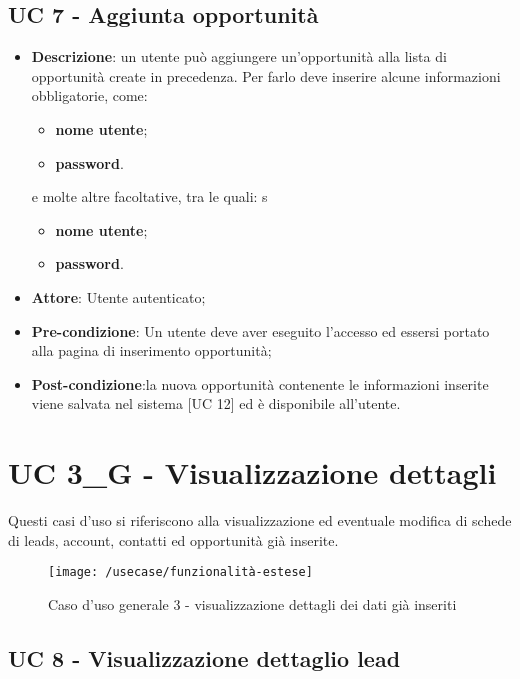 \subsection{UC 7 - Aggiunta opportunità} %


\begin{itemize}
	\item \textbf{Descrizione}: un utente può aggiungere un'opportunità alla lista di opportunità create in precedenza. Per farlo deve inserire alcune informazioni obbligatorie, come:
	\begin{itemize}
		\item \textbf{nome utente};
		\item \textbf{password}.
	\end{itemize}
	e molte altre facoltative, tra le quali:
	s\begin{itemize}
		\item \textbf{nome utente};
		\item \textbf{password}.
	\end{itemize}
	\item \textbf{Attore}: Utente autenticato;
	\item \textbf{Pre-condizione}: Un utente deve aver eseguito l'accesso ed essersi portato alla pagina di inserimento opportunità;
	\item \textbf{Post-condizione}:la nuova opportunità contenente le informazioni inserite viene salvata nel sistema [UC 12] ed è disponibile all'utente.
\end{itemize}

\section{UC 3\_G - Visualizzazione dettagli}

Questi casi d'uso si riferiscono alla visualizzazione ed eventuale modifica di schede di leads, account, contatti ed opportunità già inserite. 

\begin{figure}[h]
	\centering
	\texttt{[image: /usecase/funzionalità-estese]}
	\caption{Caso d'uso generale 3 - visualizzazione dettagli dei dati già inseriti}
\end{figure}

\subsection{UC 8 - Visualizzazione dettaglio lead}

